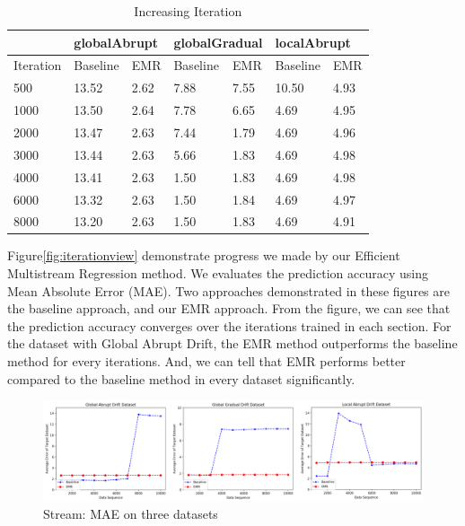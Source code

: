 \begin{table}[H]
\centering
\caption{Increasing Iteration}
\label{tab2}
\begin{tabular}{|l|l|l|l|l|l|l|}
\hline
          & \multicolumn{2}{l|}{globalAbrupt} & \multicolumn{2}{l|}{globalGradual} & \multicolumn{2}{l|}{localAbrupt} \\ \hline
Iteration & Baseline        & EMR             & Baseline         & EMR             & Baseline        & EMR            \\ \hline
500       & 13.52     & 2.62     & 7.88      & 7.55     & 10.50     & 4.93    \\ \hline
1000      & 13.50     & 2.64     & 7.78      & 6.65     & 4.69     & 4.95    \\ \hline
2000      & 13.47     & 2.63     & 7.44      & 1.79     & 4.69     & 4.96    \\ \hline
3000      & 13.44     & 2.63     & 5.66      & 1.83     & 4.69     & 4.98    \\ \hline
4000      & 13.41     & 2.63     & 1.50      & 1.83     & 4.69     & 4.98    \\ \hline
6000      & 13.32     & 2.63     & 1.50      & 1.84     & 4.69     & 4.97    \\ \hline
8000      & 13.20     & 2.63     & 1.50      & 1.83     & 4.69     & 4.91    \\ \hline
\end{tabular}
\end{table}

Figure\ref{fig:iterationview} demonstrate progress we made by our Efficient Multistream
Regression method. We evaluates the prediction accuracy using
Mean Absolute Error (MAE). Two approaches demonstrated in these figures are
the baseline approach, and our EMR approach. From the figure, we can see that the
prediction accuracy converges over the iterations trained in each
section. For the dataset with Global Abrupt Drift, the EMR method
outperforms the baseline method for every iterations. And, we can
tell that EMR performs
better compared to the baseline method in every dataset
significantly. 

\begin{figure}
\centering
\includegraphics{fig_streamview.eps}
\caption{Stream: MAE on three datasets}
\label{fig:streamview}
\end{figure}

